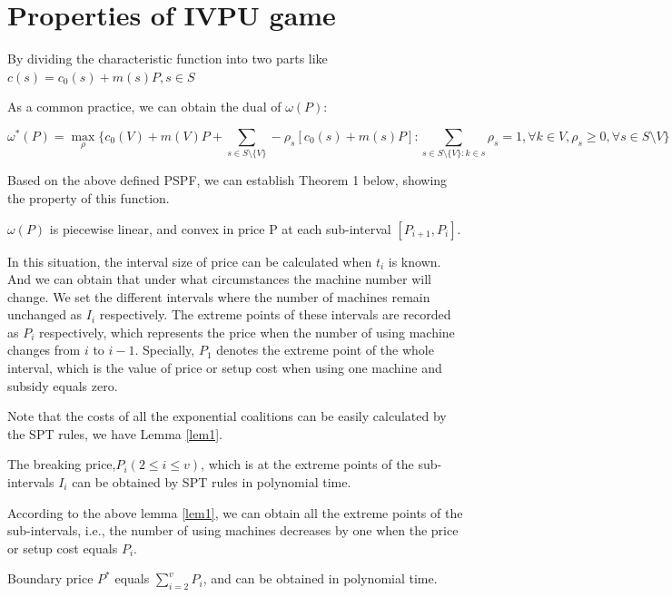 \section*{Properties of IVPU game}
By dividing the characteristic function into two parts like $c(s)=c_0(s)+m(s)P, s \in S$

As a common practice, we can obtain the dual of $\omega(P)$:

\begin{equation}\label{dual}
 {\omega^*(P)}=\mathop{\max}_{\rho} \{c_0(V)+m(V)P+\sum_{s\in S\setminus\{V\}}-\rho_s[c_0(s)+m(s)P]:
 \sum_{s\in S\setminus\{V\}:k\in s}\rho_s=1,\forall k \in V,\rho_s\geq 0,\forall s \in S \setminus{V}\}
\end{equation}

Based on the above defined PSPF, we can establish Theorem 1 below, showing the property of this function.

\begin{thm}\label{thm1}
$\omega(P)$ is piecewise linear, and convex in price P at each sub-interval $[P_{i+1},P_{i}]$.
\end{thm}

In this situation, the interval size of price can be calculated when $t_i$ is known. And we can obtain that under what circumstances the machine number will change. We set the different intervals where the number of machines remain unchanged as $I_i$ respectively. The extreme points of these intervals are recorded as $P_i$ respectively, which represents the price when the number of using machine changes from $i$ to $i-1$. Specially, $P_1$ denotes the extreme point of the whole interval, which is the value of price or setup cost when using one machine and subsidy equals zero.

Note that the costs of all the exponential coalitions can be easily calculated by the SPT rules, we have Lemma \ref{lem1}.

\begin{lem}\label{lem1}

The breaking price,$P_i(2 \leq i \leq v)$, which is at the extreme points of the sub-intervals $I_i$ can be obtained by SPT rules in polynomial time.
\end{lem}

According to the above lemma \ref{lem1}, we can obtain all the extreme points of the sub-intervals, i.e., the number of using machines decreases by one when the price or setup cost equals $P_i$.

\begin{thm}\label{thm2}
Boundary price $P^*$ equals $\sum_{i=2}^v P_i$, and can be obtained in polynomial time.
\end{thm}

